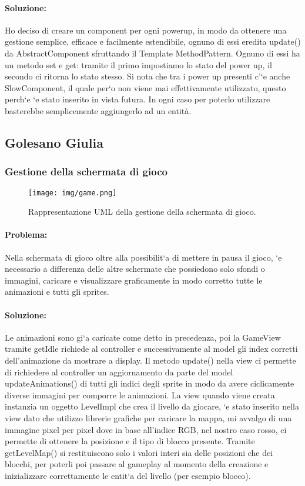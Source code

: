 \paragraph{Soluzione:}
Ho deciso di creare un component per ogni powerup, in modo da ottenere una gestione semplice, efficace e facilmente estendibile, ognuno di essi eredita update() da AbstractComponent sfruttando il Template MethodPattern. Ognuno di essi ha un metodo set e get: tramite il primo impostiamo lo stato del power up, il secondo ci ritorna lo stato stesso. Si nota che tra i power up presenti c’`e anche SlowComponent, il quale per`o non viene mai effettivamente utilizzato, questo perch`e `e stato inserito in vista futura. In ogni caso per poterlo utilizzare basterebbe semplicemente aggiungerlo ad un entità.




\subsection{Golesano Giulia}

\subsubsection{Gestione della schermata di gioco}

\begin{figure}[H]
\centering{}
\texttt{[image: img/game.png]}
\caption{Rappresentazione UML della gestione della schermata di gioco.}
\end{figure}

\paragraph{Problema:}
Nella schermata di gioco oltre alla possibilit`a di mettere in pausa il gioco, `e necessario a differenza delle altre schermate che possiedono solo sfondi o immagini, caricare e visualizzare graficamente in modo corretto tutte le animazioni e tutti gli sprites.

\paragraph{Soluzione:}
Le animazioni sono gi`a caricate come detto in precedenza, poi la GameView tramite getIdle richiede al controller e successivamente al model gli index corretti dell’animazione da mostrare a display. Il metodo update() nella view ci permette di richiedere al controller un aggiornamento da parte del model updateAnimations() di tutti gli indici degli sprite in modo da avere ciclicamente diverse immagini per comporre le animazioni. La view quando viene creata instanzia un oggetto LevelImpl che crea il livello da giocare, `e stato inserito nella view dato che utilizzo librerie grafiche per caricare la mappa, mi avvalgo di una immagine pixel per pixel dove in base all’indice RGB, nel nostro caso rosso, ci permette di ottenere la posizione e il tipo di blocco presente. Tramite getLevelMap() si restituiscono solo i valori interi sia delle posizioni che dei blocchi, per poterli poi passare al gameplay al momento della creazione e inizializzare correttamente le entit`a del livello (per esempio blocco).

